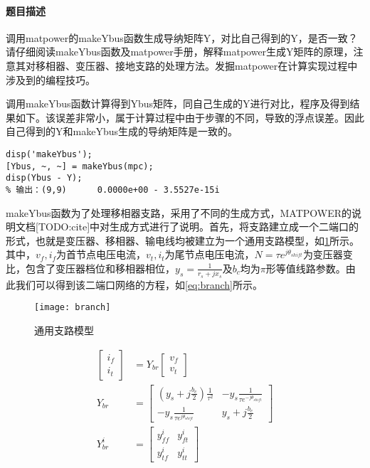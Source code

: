 \documentclass[a4paper,12pt]{article}
\begin{document}
    \paragraph{题目描述} 调用matpower的makeYbus函数生成导纳矩阵Y，对比自己得到的Y，是否一致？请仔细阅读makeYbus函数及matpower手册，解释matpower生成Y矩阵的原理，注意其对移相器、变压器、接地支路的处理方法。发掘matpower在计算实现过程中涉及到的编程技巧。

    调用makeYbus函数计算得到Ybus矩阵，同自己生成的Y进行对比，程序及得到结果如下。该误差非常小，属于计算过程中由于步骤的不同，导致的浮点误差。因此自己得到的Y和makeYbus生成的导纳矩阵是一致的。
    \begin{lstlisting}[style=Matlab-editor,basicstyle=\mlttfamily]
%% makeYbus
disp('makeYbus');
[Ybus, ~, ~] = makeYbus(mpc);
disp(Ybus - Y);
% 输出：(9,9)      0.0000e+00 - 3.5527e-15i
    \end{lstlisting}

    makeYbus函数为了处理移相器支路，采用了不同的生成方式，MATPOWER的说明文档[TODO:cite]中对生成方式进行了说明。首先，将支路建立成一个二端口的形式，也就是变压器、移相器、输电线均被建立为一个通用支路模型，如\cref{fig:branch}所示。其中，$v_f,i_f$为首节点电压电流，$v_t,i_t$为尾节点电压电流，$N=\tau e^{j\theta_{shift}}$为变压器变比，包含了变压器档位和移相器相位，$y_s=\frac{1}{r_s+j x_s}$及$b_c$均为$\pi$形等值线路参数。由此我们可以得到该二端口网络的方程，如\cref{eq:branch}所示。

    \begin{figure}
      \texttt{[image: branch]}
      \caption{通用支路模型}
      \label{fig:branch}
    \end{figure}
    \begin{equation}
      \label{eq:branch}
      \begin{aligned}
        \begin{bmatrix}
          i_f\\
          i_t
        \end{bmatrix} &= Y_{br}
        \begin{bmatrix}
          v_f\\
          v_t
        \end{bmatrix} \\
        Y_{br} &= \begin{bmatrix}
          (y_s+j\frac{b_c}{2})\frac{1}{\tau^2} & -y_s\frac{1}{\tau e^{-j\theta_{shift}}} \\
          -y_s\frac{1}{\tau e^{j\theta_{shift}}} & y_s+j\frac{b_c}{2}
      \end{bmatrix}\\
      Y_{br}^i &=
      \begin{bmatrix}
        y_{ff}^i & y_{ft}^i\\
        y_{tf}^i & y_{tt}^i
      \end{bmatrix}
      \end{aligned}
    \end{equation}
\end{document}
